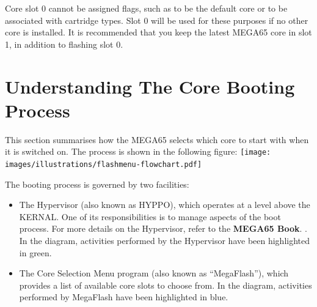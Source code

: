 Core slot 0 cannot be assigned flags, such as to be the default core or to be associated with cartridge types. Slot 0 will be used for these purposes if no other core is installed. It is recommended that you keep the latest MEGA65 core in slot 1, in addition to flashing slot 0.


\section{Understanding The Core Booting Process}
\nopagebreak
This section summarises how the MEGA65 selects which core to start with when it is switched on. The process is shown in the following figure:
\nopagebreak
\texttt{[image: images/illustrations/flashmenu-flowchart.pdf]}

The booting process is governed by two facilities:
\begin{itemize}
  \item The Hypervisor (also known as HYPPO), which operates at a level above the KERNAL. One of its responsibilities is to manage aspects of the boot process. For more details on the Hypervisor, refer to
\ifdefined\printmanual
the {\bf MEGA65 Book}.
\else
 .
\fi
    In the diagram, activities performed by the Hypervisor have been highlighted in green.
  \item The Core Selection Menu program (also known as ``MegaFlash''), which provides a list of available core slots to choose from. In the diagram, activities performed by MegaFlash have been highlighted in blue.
\end{itemize}

